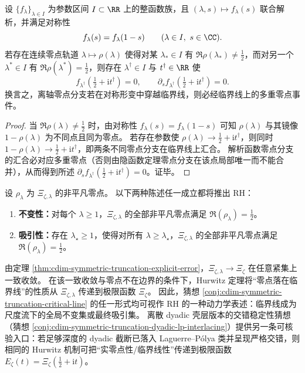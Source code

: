 \begin{proposition}[对称解析形变中的临界线多重零点屏障]\label{prop:cdim-symmetric-truncation-multiple-zero-barrier}
设 \(\{f_\lambda\}_{\lambda\in I}\) 为参数区间 \(I\subset\RR\) 上的整函数族，且 \((\lambda,s)\mapsto f_\lambda(s)\) 联合解析，并满足对称性
\[
f_\lambda(s)=f_\lambda(1-s)\qquad(\lambda\in I,\ s\in\CC).
\]
若存在连续零点轨道 \(\lambda\mapsto \rho(\lambda)\) 使得对某 \(\lambda_*\in I\) 有 \(\Re\rho(\lambda_*)\neq\tfrac12\)，而对另一个 \(\lambda^*\in I\) 有 \(\Re\rho(\lambda^*)=\tfrac12\)，则存在 \(\lambda^\dagger\in I\) 与 \(t^\dagger\in\RR\) 使
\[
f_{\lambda^\dagger}\!\left(\tfrac12+\mathrm{i}t^\dagger\right)=0,
\qquad
\partial_s f_{\lambda^\dagger}\!\left(\tfrac12+\mathrm{i}t^\dagger\right)=0.
\]
换言之，离轴零点分支若在对称形变中穿越临界线，则必经临界线上的多重零点事件。
\end{proposition}
\begin{proof}
当 \(\Re\rho(\lambda)\neq\tfrac12\) 时，由对称性 \(f_\lambda(s)=f_\lambda(1-s)\) 可知 \(\rho(\lambda)\) 与其镜像 \(1-\rho(\lambda)\) 为不同点且同为零点。
若存在参数使 \(\rho(\lambda)\to \tfrac12+\mathrm{i}t^\dagger\)，则同时 \(1-\rho(\lambda)\to \tfrac12+\mathrm{i}t^\dagger\)，即两条不同零点分支在临界线上汇合。
解析函数零点分支的汇合必对应多重零点（否则由隐函数定理零点分支在该点局部唯一而不能合并），从而得到所述 \(\partial_s f_{\lambda^\dagger}(\tfrac12+\mathrm{i}t^\dagger)=0\)。证毕。
\end{proof}

\begin{conjecture}[尺度流的临界线不变性与吸引性]\label{conj:cdim-symmetric-truncation-critical-line}
设 \(\rho_\lambda\) 为 \(\Xi_{\zeta,\lambda}\) 的非平凡零点。
以下两种陈述任一成立都将推出 RH：
\begin{enumerate}
  \item \textbf{不变性：}对每个 \(\lambda\ge 1\)，\(\Xi_{\zeta,\lambda}\) 的全部非平凡零点满足 \(\Re(\rho_\lambda)=\tfrac12\)。
  \item \textbf{吸引性：}存在 \(\lambda_\star\ge 1\)，使得对所有 \(\lambda\ge \lambda_\star\)，\(\Xi_{\zeta,\lambda}\) 的全部非平凡零点满足 \(\Re(\rho_\lambda)=\tfrac12\)。
\end{enumerate}
\end{conjecture}

\begin{remark}\label{rem:cdim-symmetric-truncation-critical-line-implies-rh}
由定理 \ref{thm:cdim-symmetric-truncation-explicit-error}，\(\Xi_{\zeta,\lambda}\to \Xi_\zeta\) 在任意紧集上一致收敛。
在该一致收敛与零点不在边界的条件下，Hurwitz 定理将“零点落在临界线”的性质从 \(\Xi_{\zeta,\lambda}\) 传递到极限函数 \(\Xi_\zeta\)。
因此，猜想 \ref{conj:cdim-symmetric-truncation-critical-line} 的任一形式均可视作 RH 的一种动力学表述：临界线成为尺度流下的全局不变集或最终吸引集。
离散 dyadic 壳层版本的交错稳定性猜想（猜想 \ref{conj:cdim-symmetric-truncation-dyadic-lp-interlacing}）提供另一条可核验入口：若足够深度的 dyadic 截断已落入 Laguerre--P\'olya 类并呈现严格交错，则相同的 Hurwitz 机制可把“实零点性/临界线性”传递到极限函数 \(E_\zeta(t)=\Xi_\zeta(\tfrac12+\mathrm{i}t)\)。
\end{remark}

